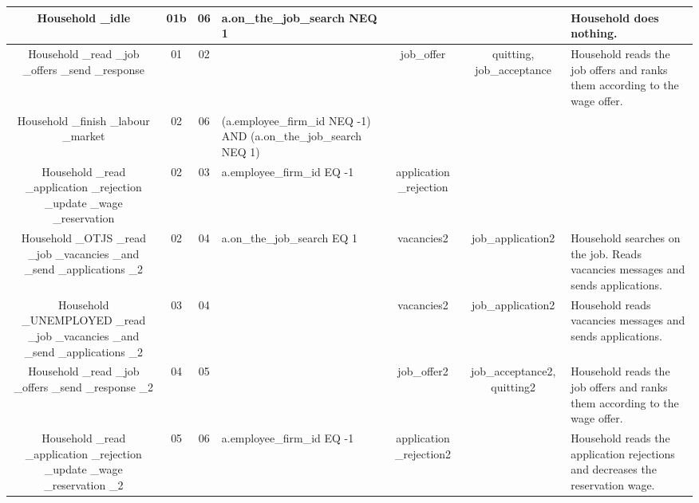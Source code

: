 \begin{landscape}
\begin{table}[!htb]
\begin{center}
\begin{tabular}{|c|c|c|l|c|c|l|}
{\parbox[l]{3cm}{Household \_idle}}& {\parbox[l]{3cm}{01b}}&
{\parbox[l]{3cm}{06}}& {\parbox[l]{3cm}{a.on\_the\_job\_search NEQ
1}}&&&{\parbox[l]{3cm}{Household does nothing.}}
\\



\hline {\parbox[l]{3cm}{Household \_read \_job \_offers \_send
\_response}}& {\parbox[l]{3cm}{01}}& {\parbox[l]{3cm}{02}}&&
{\parbox[l]{3cm}{job\_offer}}
 & {\parbox[l]{3cm}{quitting, job\_acceptance}}&{\parbox[l]{3cm}{Household reads the job offers and ranks them
according to the wage offer.}}
\\
\hline {\parbox[l]{3cm}{Household \_finish \_labour \_market}}&
{\parbox[l]{3cm}{02}}& {\parbox[l]{3cm}{06}}&
{\parbox[l]{3cm}{(a.employee\_firm\_id NEQ -1) AND
(a.on\_the\_job\_search NEQ 1)}}&  & &
\\
\hline {\parbox[l]{3cm}{Household \_read \_application \_rejection
\_update \_wage \_reservation}}& {\parbox[l]{3cm}{02}}&
{\parbox[l]{3cm}{03}}& {\parbox[l]{3cm}{a.employee\_firm\_id EQ
-1}}& {\parbox[l]{3cm}{application \_rejection}} & &
\\
\hline



{\parbox[l]{3cm}{Household \_OTJS \_read \_job \_vacancies \_and
\_send \_applications \_2}}& {\parbox[l]{3cm}{02}}&
{\parbox[l]{3cm}{04}}&{\parbox[l]{3cm}{a.on\_the\_job\_search EQ 1}}
 & {\parbox[l]{3cm}{vacancies2}}&{\parbox[l]{3cm}{job\_application2}} &
 {\parbox[l]{3cm}{Household searches on the job. Reads vacancies messages
and sends applications.}}
\\

\hline

{\parbox[l]{3cm}{Household \_UNEMPLOYED \_read \_job \_vacancies
\_and \_send \_applications \_2}}& {\parbox[l]{3cm}{03}}&
{\parbox[l]{3cm}{04}}& & {\parbox[l]{3cm}{vacancies2}}&
{\parbox[l]{3cm}{job\_application2}}&{\parbox[l]{3cm}{Household
reads vacancies messages and sends applications.}}
\\
\hline {\parbox[l]{3cm}{Household \_read \_job \_offers \_send
\_response \_2}}& {\parbox[l]{3cm}{04}}& {\parbox[l]{3cm}{05}}&
 &{\parbox[l]{3cm}{job\_offer2}} &{\parbox[l]{3cm}{job\_acceptance2, quitting2}} &{\parbox[l]{3cm}{Household reads the job offers and ranks them
according to the wage offer.}}
\\

\hline {\parbox[l]{3cm}{Household \_read \_application \_rejection
\_update \_wage \_reservation \_2}}& {\parbox[l]{3cm}{05}}&
{\parbox[l]{3cm}{06}}&{\parbox[l]{3cm}{a.employee\_firm\_id EQ -1}}
 & {\parbox[l]{3cm}{application \_rejection2}}& &{\parbox[l]{3cm}{Household reads the application rejections and decreases
the reservation wage.}}
\\


\end{tabular}
\end{center}
\end{table}
\end{landscape}
